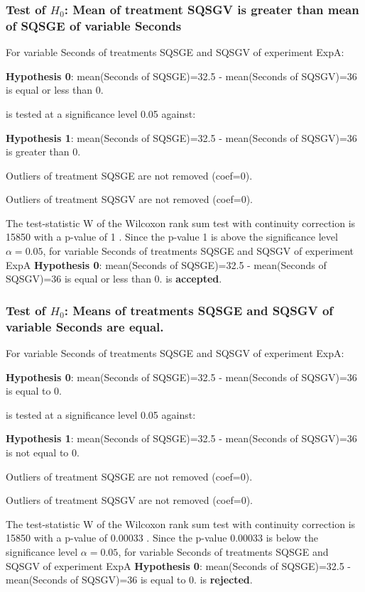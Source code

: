 \documentclass[18pt,c]{beamer}
\makeatletter
\let\beamer@writeslidentry@miniframeson=\beamer@writeslidentry
\newcommand*{\miniframeson}{\let\beamer@writeslidentry=\beamer@writeslidentry@miniframeson}
\makeatother
\begin{document}
\begin{frame}[t]
 \frametitle{Test of $H_{0}$: Mean of treatment SQSGV is greater than mean of SQSGE of variable Seconds }
 \scriptsize
 For variable Seconds of treatments SQSGE and SQSGV of experiment ExpA:

\vspace{1mm}
{\bf Hypothesis 0}: mean(Seconds of SQSGE)=32.5 - mean(Seconds of SQSGV)=36 is equal or less than 0.


 \begin{center} is tested at a significance level 0.05 against: \end{center}

{\bf Hypothesis 1}: mean(Seconds of SQSGE)=32.5 - mean(Seconds of SQSGV)=36 is greater than 0.
\vspace{1mm}
\vspace{1mm}

 Outliers of treatment SQSGE  are not removed (coef=0).

 Outliers of treatment SQSGV  are not removed (coef=0).
\vspace{1mm}
 
 The test-statistic W of the Wilcoxon rank sum test with continuity correction is 15850 with a p-value of 1 .
 Since the p-value 1 is above the significance level $\alpha= 0.05 $,
 for variable Seconds of treatments SQSGE and SQSGV of experiment ExpA 
 {\bf Hypothesis 0}: mean(Seconds of SQSGE)=32.5 - mean(Seconds of SQSGV)=36 is equal or less than 0.
is {\bf accepted}.

 \end{frame}
\begin{frame}[t]
 \frametitle{Test of $H_{0}$: Means of treatments SQSGE and SQSGV of variable Seconds are equal. }
 \scriptsize
 For variable Seconds of treatments SQSGE and SQSGV of experiment ExpA:

\vspace{1mm}
{\bf Hypothesis 0}: mean(Seconds of SQSGE)=32.5 - mean(Seconds of SQSGV)=36 is equal to 0.


 \begin{center} is tested at a significance level 0.05 against: \end{center}

{\bf Hypothesis 1}: mean(Seconds of SQSGE)=32.5 - mean(Seconds of SQSGV)=36 is not equal to 0.
\vspace{1mm}
\vspace{1mm}

 Outliers of treatment SQSGE  are not removed (coef=0).

 Outliers of treatment SQSGV  are not removed (coef=0).
\vspace{1mm}
 
 The test-statistic W of the Wilcoxon rank sum test with continuity correction is 15850 with a p-value of 0.00033 .
 Since the p-value 0.00033 is below the significance level $\alpha= 0.05 $,
 for variable Seconds of treatments SQSGE and SQSGV of experiment ExpA 
 {\bf Hypothesis 0}: mean(Seconds of SQSGE)=32.5 - mean(Seconds of SQSGV)=36 is equal to 0.
is {\bf rejected}.

 \end{frame}
\miniframeson
\end{document}

